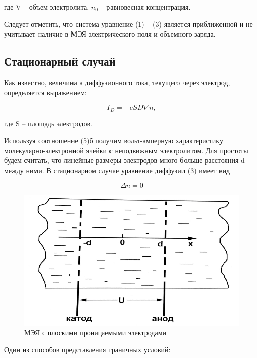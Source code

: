 \documentclass[a4paper,12pt]{article}
\begin{document}
где V -- объем  электролита, $n_0$ -- равновесная концентрация. 

Следует отметить, что система уравнение (1) -- (3) является приближенной и не учитывает наличие в МЭЯ электрического поля и объемного заряда.

\subsection{Стационарный случай}

Как известно, величина а диффузионного тока, текущего через электрод, определяется выражением:

\begin{equation}
	I_D = - e S D \nabla n,
\end{equation}

где S -- площадь электродов.

Используя соотношение (5)б получим вольт-амперную характеристику молекулярно-электронной ячейки с неподвижным электролитом. Для простоты будем считать, что линейные размеры электродов много больше расстояния d между ними. В стационарном случае уравнение диффузии (3) имеет вид

\begin{equation}
	\Delta n = 0
\end{equation}

\begin{figure}[h]
	\begin{center}
		\includegraphics[scale=0.8]{fig2}
		\caption{МЭЯ с плоскими проницаемыми электродами}
		\label{MEYA}
	\end{center}
\end{figure}

\newpage

Один из способов представления граничных условий:
\end{document}

